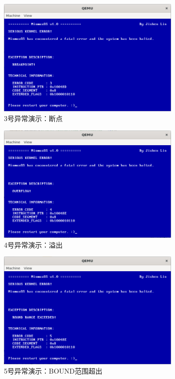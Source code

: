\begin{figure}[htbp]
    \centering
    \includegraphics[width=0.8\textwidth]{figures/Exception3Presentation.png}
    \caption{3号异常演示：断点}
\end{figure}

\begin{figure}[htbp]
    \centering
    \includegraphics[width=0.8\textwidth]{figures/Exception4Presentation.png}
    \caption{4号异常演示：溢出}
\end{figure}

\begin{figure}[htbp]
    \centering
    \includegraphics[width=0.8\textwidth]{figures/Exception5Presentation.png}
    \caption{5号异常演示：BOUND范围超出}
\end{figure}


